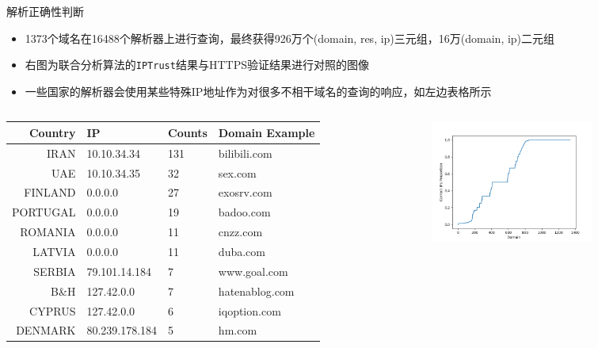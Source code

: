 \documentclass{beamer}
\begin{document}
\begin{frame}{解析正确性判断}
\begin{itemize}
  \item 1373个域名在16488个解析器上进行查询，最终获得926万个(domain, res, ip)三元组，16万(domain, ip)二元组
  \item 右图为联合分析算法的\texttt{IPTrust}结果与HTTPS验证结果进行对照的图像
  \item 一些国家的解析器会使用某些特殊IP地址作为对很多不相干域名的查询的响应，如左边表格所示

\end{itemize}

  \begin{columns}
      
    \begin{column}{0.5\textwidth}
      \begin{table}
        \tiny
        \begin{tabular}{r l l l}
          \toprule
          Country &IP & Counts & Domain Example\\
          \midrule
               
          IRAN &	10.10.34.34&131&bilibili.com\\
          UAE &	10.10.34.35&32&sex.com\\
          FINLAND &	0.0.0.0 & 27 &exosrv.com\\
          PORTUGAL &	0.0.0.0&19&badoo.com\\
          ROMANIA &	0.0.0.0&11&cnzz.com\\
          LATVIA &	0.0.0.0&11&duba.com\\
          SERBIA &	79.101.14.184&7&www.goal.com\\
          B\&H &	127.42.0.0& 7&hatenablog.com\\
          CYPRUS &	127.42.0.0&6&iqoption.com\\
          DENMARK &	80.239.178.184&5&hm.com\\
          \bottomrule
          \end{tabular}
      \end{table}
  
    \end{column}
    \begin{column}{0.5\textwidth}
      \begin{figure}
        \centering
        \includegraphics[height=4cm]{figures/tlsvsal.png}
        \label{fig:resolvercy}
      \end{figure}
    \end{column}
    \end{columns}
\end{frame}
\end{document}
